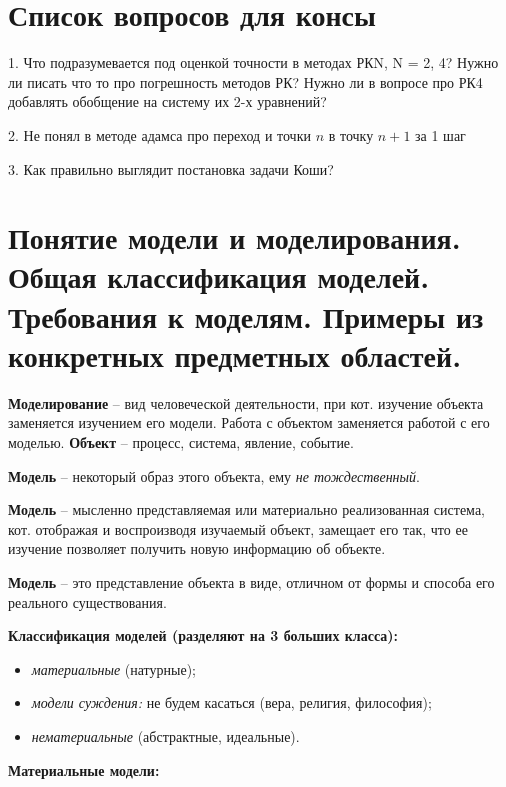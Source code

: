 \section*{Список вопросов для консы} %

1. Что подразумевается под оценкой точности в методах РКN, N = 2, 4? Нужно ли писать что то про погрешность методов РК? Нужно ли в вопросе про РК4 добавлять обобщение на систему их 2-х уравнений?

2. Не понял в методе адамса про переход и точки $n$ в точку $n + 1$ за 1 шаг

3. Как правильно выглядит постановка задачи Коши?

\section*{Понятие модели и моделирования. Общая классификация моделей. Требования к моделям. Примеры из конкретных предметных областей.} %

\textbf{Моделирование} -- вид человеческой деятельности, при кот. изучение объекта заменяется изучением его модели. Работа с объектом заменяется работой с его моделью. \textbf{Объект} -- процесс, система, явление, событие.

\textbf{Модель} -- некоторый образ этого объекта, ему \textit{не тождественный}.

\textbf{Модель} -- мысленно представляемая или материально реализованная система, кот. отображая и воспроизводя изучаемый объект, замещает его так, что ее изучение позволяет получить новую информацию об объекте.

\textbf{Модель} -- это представление объекта в виде, отличном от формы и способа его реального существования.

\textbf{Классификация моделей (разделяют на 3 больших класса):}

\begin{itemize}[label*=--]
	\item \textit{материальные} (натурные);
	\item \textit{модели суждения:} не будем касаться (вера, религия, философия);
	\item \textit{нематериальные} (абстрактные, идеальные).
\end{itemize}

\textbf{Материальные модели:}

